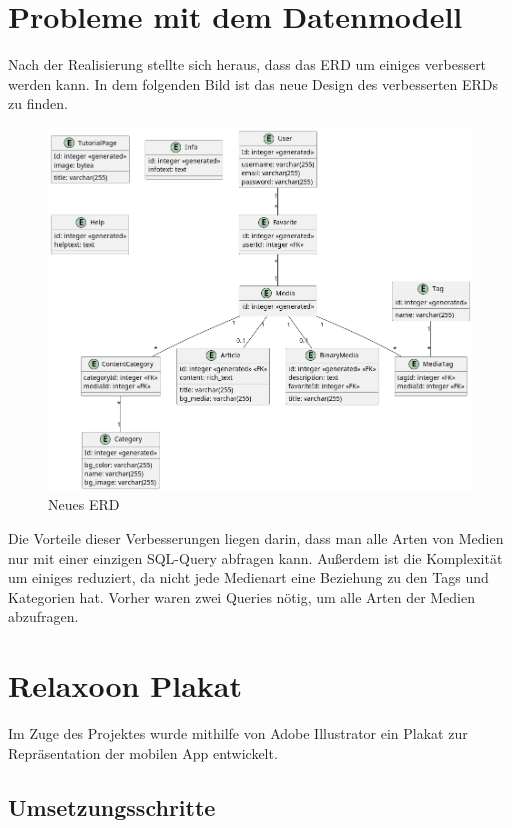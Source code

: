 \section{Probleme mit dem Datenmodell}
Nach der Realisierung stellte sich heraus, dass das ERD um einiges verbessert werden kann. In dem folgenden Bild ist das neue Design des verbesserten ERDs zu finden.
\begin{figure}[H]
    \centering
    \includegraphics[width=\textwidth]{./pics/new-erd}
    \caption{Neues ERD}
\end{figure}

Die Vorteile dieser Verbesserungen liegen darin, dass man alle Arten von Medien nur mit einer einzigen SQL-Query abfragen kann. Außerdem ist die Komplexität um einiges reduziert, da nicht jede Medienart eine Beziehung zu den Tags und Kategorien hat.
Vorher waren zwei Queries nötig, um alle Arten der Medien abzufragen.

\section{Relaxoon Plakat}\label{sec:plakat}

Im Zuge des Projektes wurde mithilfe von Adobe Illustrator ein Plakat zur Repräsentation der mobilen App
entwickelt.

\subsection{Umsetzungsschritte}

